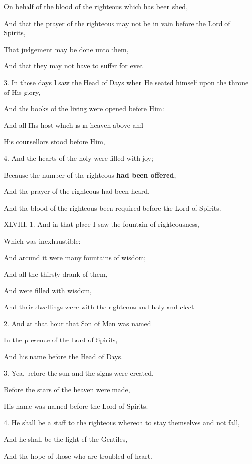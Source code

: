On behalf of the blood of the righteous which has been shed,

And that the prayer of the righteous may not be in vain before the Lord of Spirits,

That judgement may be done unto them,

And that they may not have to suffer for ever.

3. In those days I saw the Head of Days when He seated himself upon the throne of His glory,

And the books of the living were opened before Him:

And all His host which is in heaven above and

His counsellors stood before Him,

4. And the hearts of the holy were filled with joy;

Because the number of the righteous \textbf{had been offered},

And the prayer of the righteous had been heard,

And the blood of the righteous been required before the Lord of Spirits.


XLVIII. 1. And in that place I saw the fountain of righteousness,

Which was inexhaustible:

And around it were many fountains of wisdom;

And all the thirsty drank of them,

And were filled with wisdom,

And their dwellings were with the righteous and holy and elect.

2. And at that hour that Son of Man was named

In the presence of the Lord of Spirits,

And his name before the Head of Days.

3. Yea, before the sun and the signs were created,

Before the stars of the heaven were made,

His name was named before the Lord of Spirits.

4. He shall be a staff to the righteous whereon to stay themselves and not fall,

And he shall be the light of the Gentiles,

And the hope of those who are troubled of heart.

